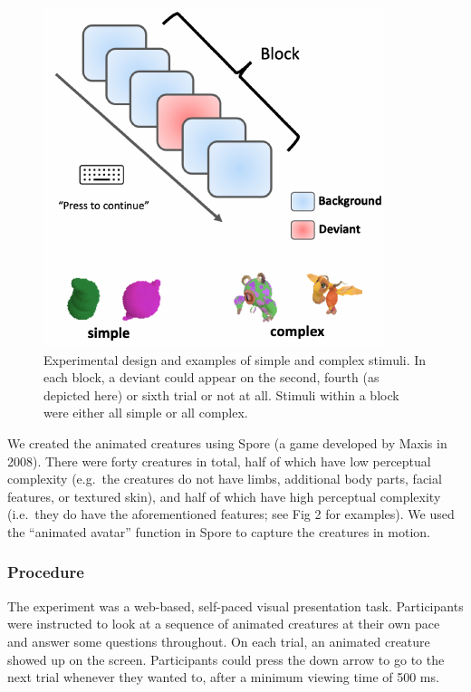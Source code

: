 \documentclass[10pt, letterpaper]{article}
\newenvironment{CodeChunk}{}{}
\begin{document}
\begin{CodeChunk}
\begin{figure}[h]

{\centering \includegraphics{figs/experimental_design-1} 

}

\caption[Experimental design and examples of simple and complex stimuli]{Experimental design and examples of simple and complex stimuli. In each block, a deviant could appear on the second, fourth (as depicted here) or sixth trial or not at all. Stimuli within a block were either all simple or all complex.}\label{fig:experimental_design}
\end{figure}
\end{CodeChunk}

We created the animated creatures using Spore (a game developed by Maxis
in 2008). There were forty creatures in total, half of which have low
perceptual complexity (e.g.~the creatures do not have limbs, additional
body parts, facial features, or textured skin), and half of which have
high perceptual complexity (i.e.~they do have the aforementioned
features; see Fig 2 for examples). We used the ``animated avatar''
function in Spore to capture the creatures in motion.

\hypertarget{procedure}{%
\subsubsection{Procedure}\label{procedure}}

The experiment was a web-based, self-paced visual presentation task.
Participants were instructed to look at a sequence of animated creatures
at their own pace and answer some questions throughout. On each trial,
an animated creature showed up on the screen. Participants could press
the down arrow to go to the next trial whenever they wanted to, after a
minimum viewing time of 500 ms.
\end{document}
